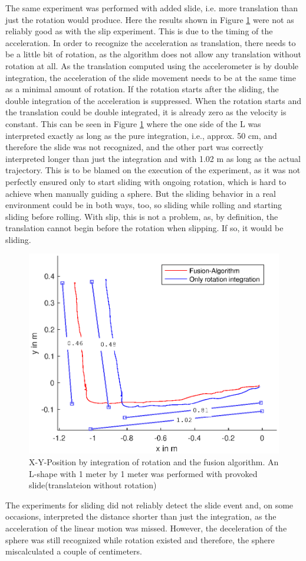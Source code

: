 \documentclass[letterpaper, 10 pt, conference]{ieeeconf}  %
\begin{document}
The same experiment was performed with added slide, i.e. more translation than just the rotation would produce.
Here the results shown in Figure \ref{LTestSlide} were not as reliably good as with the slip experiment.
This is due to the timing of the acceleration. In order to recognize the acceleration as translation, there needs to be a little bit of rotation, as the algorithm does not allow any translation without rotation at all.
As the translation computed using the accelerometer is by double integration, the acceleration of the slide movement needs to be at the same time as a minimal amount of rotation.
If the rotation starts after the sliding, the double integration of the acceleration is suppressed.
When the rotation starts and the translation could be double integrated, it is already zero as the velocity is constant.
This can be seen in Figure \ref{LTestSlide} where the one side of the L was interpreted exactly as long as the pure integration, i.e., approx. 50 cm, and therefore the slide was not recognized, and the other part was correctly interpreted longer than just the integration and with 1.02 m as long as the actual trajectory.
This is to be blamed on the execution of the experiment, as it was not perfectly ensured only to start sliding with ongoing rotation, which is hard to achieve when manually guiding a sphere.
But the sliding behavior in a real environment could be in both ways, too, so sliding while rolling and starting sliding before rolling.
With slip, this is not a problem, as, by definition, the translation cannot begin before the rotation when slipping.
If so, it would be sliding.
\begin{figure}
\includegraphics[width=\linewidth]{./graphics/LTestSlide.eps}
\caption{X-Y-Position by integration of rotation and the fusion algorithm. An L-shape with 1 meter by 1 meter was performed with provoked slide(translateion without rotation)}
\label{LTestSlide}
\end{figure}
The experiments for sliding did not reliably detect the slide event and, on some occasions, interpreted the distance shorter than just the integration, as the acceleration of the linear motion was missed.
However, the deceleration of the sphere was still recognized while rotation existed and therefore, the sphere miscalculated a couple of centimeters.
\end{document}
